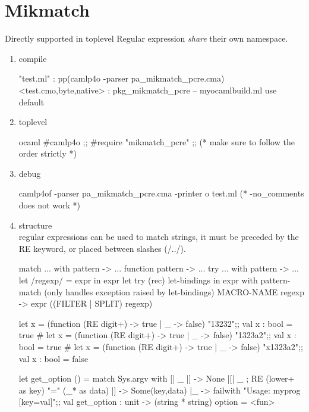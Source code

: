 \section{Mikmatch}
\label{sec:mikmatch}
Directly supported in toplevel
Regular expression \emph{share} their own namespace.
\begin{enumerate}
\item compile
\begin{bluetext}
"test.ml" : pp(camlp4o -parser pa_mikmatch_pcre.cma)
<test.{cmo,byte,native}> : pkg_mikmatch_pcre
-- myocamlbuild.ml use default 
\end{bluetext}
\item toplevel
\begin{ocamlcode}
ocaml
#camlp4o ;;
#require "mikmatch_pcre" ;; (* make sure to follow the order strictly *)
\end{ocamlcode}
\item debug

  \begin{bluetext}
camlp4of -parser pa_mikmatch_pcre.cma -printer o test.ml
(* -no_comments does not work    *)
\end{bluetext}

\item structure \\
  regular expressions can be used to match strings, it must be preceded by
  the RE keyword, or placed between slashes (/../).

  \begin{ocamlcode}
    match ... with pattern -> ...
    function pattern -> ...
    try ... with pattern -> ... 
    let /regexp/ = expr in expr
    let try (rec) let-bindings in expr with pattern-match
    (only handles exception raised by let-bindings)
    MACRO-NAME regexp -> expr ((FILTER | SPLIT) regexp)
    
  \end{ocamlcode}

  \begin{alternate}
let x = (function (RE digit+) -> true | _ -> false) "13232";;
val x : bool = true
# let x = (function (RE digit+) -> true | _ -> false) "1323a2";;
val x : bool = true
# let x = (function (RE digit+) -> true | _ -> false) "x1323a2";;
val x : bool = false    
\end{alternate}

\begin{ocamlcode}
let get_option () = match Sys.argv with 
     [| _ |] -> None 
    |[| _ ; RE (lower+ as key) "=" (_* as data) |] -> Some(key,data)
    |_ -> failwith "Usage: myprog [key=val]";;
val get_option : unit -> (string * string) option = <fun>
\end{ocamlcode}


\end{enumerate}
